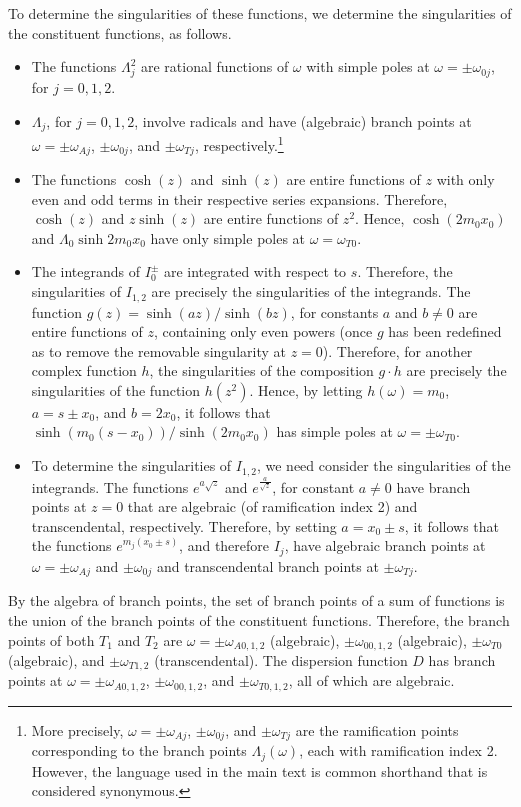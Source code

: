 \documentclass[12pt]{../style-files/ociamthesis}
\begin{document}
To determine the singularities of these functions, we determine the singularities of the constituent functions, as follows.
\begin{itemize}
	\item The functions $\Lambda_j^2$ are rational functions of $\omega$ with simple poles at $\omega = \pm \omega_{0j}$, for $j = 0, 1, 2$.
	
	\item $\Lambda_j$, for $j = 0, 1, 2$, involve radicals and have (algebraic) branch points at $\omega = \pm \omega_{Aj}$, $\pm \omega_{0j}$, and $\pm \omega_{Tj}$, respectively.\footnote{More precisely, $\omega = \pm \omega_{Aj}$, $\pm \omega_{0j}$, and $\pm \omega_{Tj}$ are the ramification points corresponding to the branch points $\Lambda_j(\omega)$, each with ramification index 2. However, the language used in the main text is common shorthand that is considered synonymous.}
	
	\item The functions $\cosh(z)$ and $\sinh(z)$ are entire functions of $z$ with only even and odd terms in their respective series expansions. Therefore, $\cosh(z)$ and $z\sinh(z)$ are entire functions of $z^2$. Hence, $\cosh(2m_0x_0)$ and $\Lambda_0\sinh{2m_0x_0}$ have only simple poles at $\omega = \omega_{T0}$.
	
	\item The integrands of $I_0^\pm$ are integrated with respect to $s$. Therefore, the singularities of $I_{1,2}$ are precisely the singularities of the integrands. The function $g(z) = \sinh(az) / \sinh(bz)$, for constants $a$ and $b \neq 0$ are entire functions of $z$, containing only even powers (once $g$ has been redefined as to remove the removable singularity at $z = 0$). Therefore, for another complex function $h$, the singularities of the composition $g \cdot h$ are precisely the singularities of the function $h(z^2)$. Hence, by letting $h(\omega) = m_0$, $a = s \pm x_0$, and $b = 2x_0$, it follows that $\sinh(m_0(s - x_0)) / \sinh(2m_0x_0)$ has simple poles at $\omega = \pm \omega_{T0}$.
	
	\item To determine the singularities of $I_{1,2}$, we need consider the singularities of the integrands. The functions $e^{a\sqrt{z}}$ and $e^{\frac{a}{\sqrt{z}}}$, for constant $a \neq 0$ have branch points at $z = 0$ that are algebraic (of ramification index 2) and transcendental, respectively. Therefore, by setting $a = x_0 \pm s$, it follows that the functions $e^{m_j(x_0 \pm s)}$, and therefore $I_j$, have algebraic branch points at $\omega = \pm \omega_{Aj}$ and $\pm \omega_{0j}$ and transcendental branch points at $\pm \omega_{Tj}$.
\end{itemize}
By the algebra of branch points, the set of branch points of a sum of functions is the union of the branch points of the constituent functions. Therefore, the branch points of both $T_1$ and $T_2$ are $\omega = \pm \omega_{A0,1,2}$ (algebraic), $\pm \omega_{00,1,2}$ (algebraic), $\pm \omega_{T0}$ (algebraic), and $\pm \omega_{T1,2}$ (transcendental). The dispersion function $D$ has branch points at $\omega = \pm \omega_{A0,1,2}$, $\pm \omega_{00,1,2}$, and $\pm \omega_{T0,1,2}$, all of which are algebraic.
\end{document}
